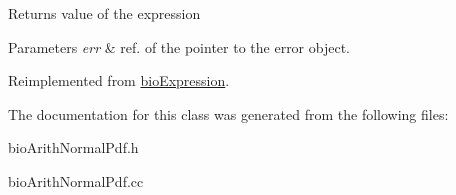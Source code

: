 \begin{DoxyReturn}{Returns}
value of the expression 
\end{DoxyReturn}

\begin{DoxyParams}{Parameters}
{\em err} & ref. of the pointer to the error object. \\
\hline
\end{DoxyParams}


Reimplemented from \hyperlink{classbio_expression_af58662a5d4d456f15bc4f2c9bd4f8a5b}{bio\+Expression}.



The documentation for this class was generated from the following files\+:\begin{DoxyCompactItemize}
\item 
bio\+Arith\+Normal\+Pdf.\+h\item 
bio\+Arith\+Normal\+Pdf.\+cc\end{DoxyCompactItemize}
